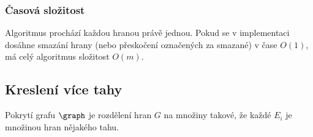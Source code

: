 \subsubsection{Časová složitost}

Algoritmus prochází každou hranou právě jednou.
Pokud se v implementaci dosáhne smazání hrany (nebo přeskočení označených za smazané) v čase $O(1)$, má celý algoritmus složitost $O(m)$.


\subsection{Kreslení více tahy}

Pokrytí grafu $\graph$ je rozdělení hran $G$ na množiny  takové, že každé $E_i$ je množinou hran nějakého tahu.


